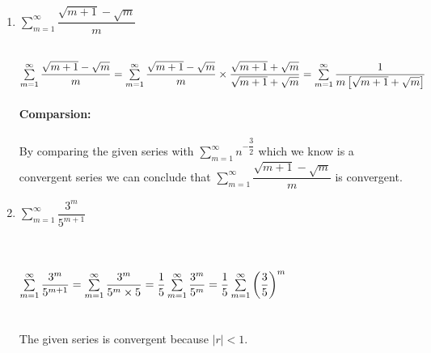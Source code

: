 \documentclass[fleqn]{article}
\begin{document}
\begin{enumerate}
\begin{enumerate}
      \item $\sum\limits_{m=1}^{\infty} \dfrac{\sqrt{m+1}-\sqrt{m}}{m}$

        \textcolor{hwColor}{
          \\
          $
            \sum\limits_{m=1}^{\infty} \dfrac{\sqrt{m+1}-\sqrt{m}}{m}
            \\
            \\
            =\sum\limits_{m=1}^{\infty} \dfrac{\sqrt{m+1}-\sqrt{m}}{m} \times \dfrac{\sqrt{m+1}+\sqrt{m}}{\sqrt{m+1}+\sqrt{m}}
            \\
            \\
            =\sum\limits_{m=1}^{\infty} \dfrac{1}{m\left[\sqrt{m+1}+\sqrt{m}\right]}
          $
          \\
          \\
          \textbf{Comparsion:}
          \\
          \\
          By comparing the given series with $\sum\limits_{m=1}^{\infty} n^{-\dfrac{3}{2}}$ which we know is a convergent series we 
          can conclude that $\sum\limits_{m=1}^{\infty} \dfrac{\sqrt{m+1}-\sqrt{m}}{m}$ is convergent.
          \\
        }

      \item $\sum\limits_{m=1}^{\infty} \dfrac{3^m}{5^{m+1}}$

        \textcolor{hwColor}{
          \\
          \\
          $
            \sum\limits_{m=1}^{\infty} \dfrac{3^m}{5^{m+1}}
            =\sum\limits_{m=1}^{\infty} \dfrac{3^m}{5^m \times 5}
            \\
            \\
            \\
            =\dfrac{1}{5} \sum\limits_{m=1}^{\infty} \dfrac{3^m}{5^m}
            =\dfrac{1}{5} \sum\limits_{m=1}^{\infty} \left(\dfrac{3}{5}\right)^m
          $
          \\
          \\
          \\
          The given series is convergent because $|r| <1$.
          \\
          \\
        }



\end{enumerate}
\end{enumerate}
\end{document}
